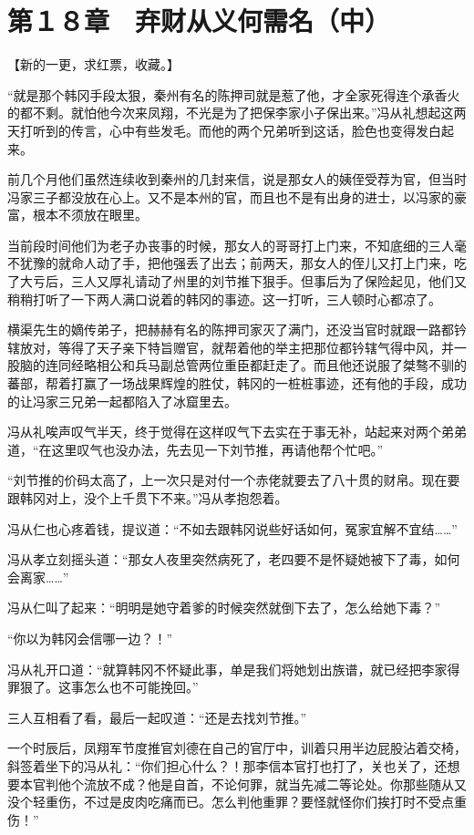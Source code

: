 \section{第１８章　弃财从义何需名（中）}

【新的一更，求红票，收藏。】

“就是那个韩冈手段太狠，秦州有名的陈押司就是惹了他，才全家死得连个承香火的都不剩。就怕他今次来凤翔，不光是为了把保李家小子保出来。”冯从礼想起这两天打听到的传言，心中有些发毛。而他的两个兄弟听到这话，脸色也变得发白起来。

前几个月他们虽然连续收到秦州的几封来信，说是那女人的姨侄受荐为官，但当时冯家三子都没放在心上。又不是本州的官，而且也不是有出身的进士，以冯家的豪富，根本不须放在眼里。

当前段时间他们为老子办丧事的时候，那女人的哥哥打上门来，不知底细的三人毫不犹豫的就命人动了手，把他强丢了出去；前两天，那女人的侄儿又打上门来，吃了大亏后，三人又厚礼请动了州里的刘节推下狠手。但事后为了保险起见，他们又稍稍打听了一下两人满口说着的韩冈的事迹。这一打听，三人顿时心都凉了。

横渠先生的嫡传弟子，把赫赫有名的陈押司家灭了满门，还没当官时就跟一路都钤辖放对，等得了天子亲下特旨赠官，就帮着他的举主把那位都钤辖气得中风，并一股脑的连同经略相公和兵马副总管两位重臣都赶走了。而且他还说服了桀骜不驯的蕃部，帮着打赢了一场战果辉煌的胜仗，韩冈的一桩桩事迹，还有他的手段，成功的让冯家三兄弟一起都陷入了冰窟里去。

冯从礼唉声叹气半天，终于觉得在这样叹气下去实在于事无补，站起来对两个弟弟道，“在这里叹气也没办法，先去见一下刘节推，再请他帮个忙吧。”

“刘节推的价码太高了，上一次只是对付一个赤佬就要去了八十贯的财帛。现在要跟韩冈对上，没个上千贯下不来。”冯从孝抱怨着。

冯从仁也心疼着钱，提议道：“不如去跟韩冈说些好话如何，冤家宜解不宜结……”

冯从孝立刻摇头道：“那女人夜里突然病死了，老四要不是怀疑她被下了毒，如何会离家……”

冯从仁叫了起来：“明明是她守着爹的时候突然就倒下去了，怎么给她下毒？”

“你以为韩冈会信哪一边？！”

冯从礼开口道：“就算韩冈不怀疑此事，单是我们将她划出族谱，就已经把李家得罪狠了。这事怎么也不可能挽回。”

三人互相看了看，最后一起叹道：“还是去找刘节推。”

一个时辰后，凤翔军节度推官刘德在自己的官厅中，训着只用半边屁股沾着交椅，斜签着坐下的冯从礼：“你们担心什么？！那李信本官打也打了，关也关了，还想要本官判他个流放不成？他是自首，不论何罪，就当先减二等论处。你那些随从又没个轻重伤，不过是皮肉吃痛而已。怎么判他重罪？要怪就怪你们挨打时不受点重伤！”


